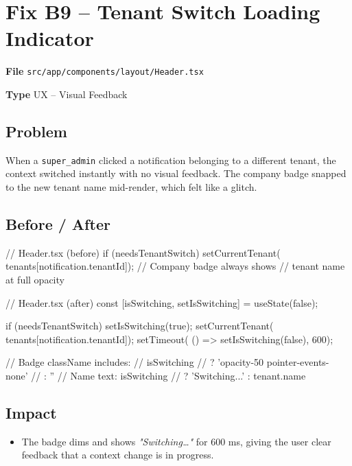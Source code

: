 \documentclass[12pt,a4paper]{report}
\newcommand{\diffL}{\noindent\begin{minipage}[t]{0.485\linewidth}}
\newcommand{\diffR}{\end{minipage}\hfill\begin{minipage}[t]{0.485\linewidth}}
\newcommand{\diffend}{\end{minipage}\par\smallskip}
\newcommand{\inforow}[2]{%
	\noindent
	\begin{tcolorbox}[
		colback   = lightblue,
		colframe  = midblue,
		arc       = 2pt,
		left      = 6pt, right = 6pt, top = 2pt, bottom = 2pt,
		sidebyside, sidebyside align = top seam,
		lefthand width = 3.2cm,
		segmentation hidden,
		]
		\textbf{\color{brandblue}\small #1}
		\tcblower
		{\small\color{labelgray} #2}
	\end{tcolorbox}\vspace{2pt}%
}
\newcommand{\file}[1]{\texttt{\small #1}}
\begin{document}
	\section{Fix B9 -- Tenant Switch Loading Indicator}

	\inforow{File}{\file{src/app/components/layout/Header.tsx}}
	\inforow{Type}{UX -- Visual Feedback}

	\subsection*{Problem}

	When a \texttt{super\_admin} clicked a notification belonging to a
	different tenant, the context switched instantly with no visual
	feedback. The company badge snapped to the new tenant name mid-render,
	which felt like a glitch.

	\subsection*{Before / After}

	\diffL
	\begin{beforecode}
// Header.tsx (before)
if (needsTenantSwitch) {
  setCurrentTenant(
    tenants[notification.tenantId]);
}
// Company badge always shows
// tenant name at full opacity
	\end{beforecode}
	\diffR
	\begin{aftercode}
// Header.tsx (after)
const [isSwitching, setIsSwitching]
  = useState(false);

if (needsTenantSwitch) {
  setIsSwitching(true);
  setCurrentTenant(
    tenants[notification.tenantId]);
  setTimeout(
    () => setIsSwitching(false), 600);
}

// Badge className includes:
// isSwitching
//   ? 'opacity-50 pointer-events-none'
//   : ''
// Name text: isSwitching
//   ? 'Switching...' : tenant.name
	\end{aftercode}
	\diffend

	\subsection*{Impact}
	\begin{itemize}
		\item The badge dims and shows \emph{"Switching\ldots"} for 600 ms, giving the user clear feedback that a context change is in progress.
	\end{itemize}
\end{document}
